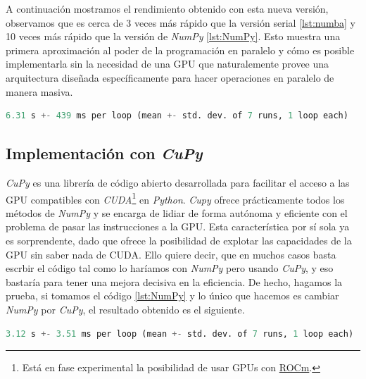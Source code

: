 A continuación mostramos el rendimiento obtenido con esta nueva versión, observamos que es cerca de 3 veces más rápido que la versión serial \ref{lst:numba} y 
10 veces más rápido que la versión de \textit{NumPy} \ref{lst:NumPy}. Esto muestra una primera aproximación al poder de la programación en paralelo y cómo es 
posible implementarla sin la necesidad de una GPU que naturalemente provee una arquitectura diseñada específicamente para hacer operaciones en paralelo de manera 
masiva.

\begin{lstlisting}[language=Python,label = {lst:numba_p_re}]
%timeit cpu_numba_parallel_solver(u,v,fu,fv,Ds)
6.31 s +- 439 ms per loop (mean +- std. dev. of 7 runs, 1 loop each)
\end{lstlisting}

\subsection{Implementación con \textit{CuPy}}

\textit{CuPy} es una librería de código abierto desarrollada para facilitar el acceso a las GPU compatibles con \textit{CUDA}\footnote{Está en fase experimental la posibilidad 
de usar GPUs con \href{https://rocmdocs.amd.com/en/latest/}{ROCm}.} en \textit{Python}. \textit{Cupy} ofrece prácticamente todos los métodos de 
\textit{NumPy} y se encarga de lidiar de forma autónoma y eficiente con el problema de pasar las instrucciones a la GPU. Esta característica por sí 
sola ya es sorprendente, dado que ofrece la posibilidad de explotar las capacidades de la GPU sin saber nada de CUDA. Ello quiere decir, que en muchos 
casos basta escrbir el código tal como lo haríamos con \textit{NumPy} pero usando \textit{CuPy}, y eso bastaría para tener una mejora decisiva en la 
eficiencia. De hecho, hagamos la prueba, si tomamos el código \ref{lst:NumPy} y lo único que hacemos es cambiar \textit{NumPy} por \textit{CuPy}, el 
resultado obtenido es el siguiente.

\begin{lstlisting}[language=Python,label = {lst:cupy}]
%timeit gpu_simple_cupy_solver(u,v,fu,fv,Ds)
3.12 s +- 3.51 ms per loop (mean +- std. dev. of 7 runs, 1 loop each)
\end{lstlisting}

